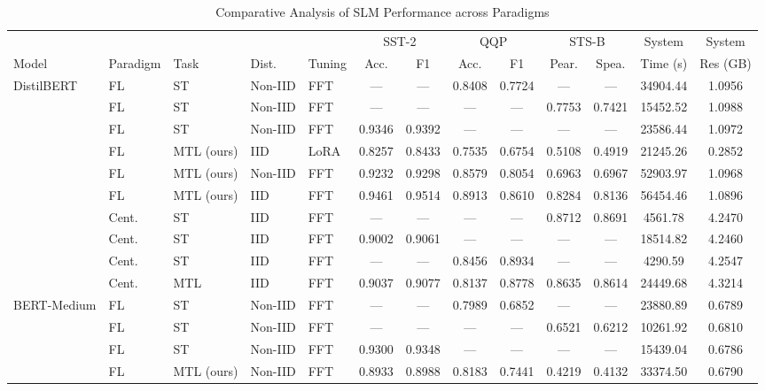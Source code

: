 \begin{table}[t]
  \centering
  \caption{Comparative Analysis of SLM Performance across Paradigms}
  \label{tab:results_consolidated}
  \scriptsize
  \setlength{\tabcolsep}{3pt}
  \begin{tabular}{lllllcccccccc}
    \toprule
    & & & & & \multicolumn{2}{c}{SST-2} & \multicolumn{2}{c}{QQP} & \multicolumn{2}{c}{STS-B} & System & System \\
    \cmidrule(lr){6-7} \cmidrule(lr){8-9} \cmidrule(lr){10-11}
    Model & Paradigm & Task & Dist. & Tuning & Acc. & F1 & Acc. & F1 & Pear. & Spea. & Time (s) & Res (GB) \\
    \midrule
    DistilBERT \cite{sanh2019distilbert} & FL & ST & Non-IID & FFT & --- & --- & 0.8408 & 0.7724 & --- & --- & 34904.44 & 1.0956 \\
     & FL & ST & Non-IID & FFT & --- & --- & --- & --- & 0.7753 & 0.7421 & 15452.52 & 1.0988 \\
     & FL & ST & Non-IID & FFT & 0.9346 & 0.9392 & --- & --- & --- & --- & 23586.44 & 1.0972 \\
     & FL & MTL (ours) & IID & LoRA & 0.8257 & 0.8433 & 0.7535 & 0.6754 & 0.5108 & 0.4919 & 21245.26 & 0.2852 \\
      & FL & MTL (ours) & Non-IID & FFT & 0.9232 & 0.9298 & 0.8579 & 0.8054 & 0.6963 & 0.6967 & 52903.97 & 1.0968 \\
      & FL & MTL (ours) & IID & FFT & 0.9461 & 0.9514 & 0.8913 & 0.8610 & 0.8284 & 0.8136 & 56454.46 & 1.0896 \\
     & Cent. & ST & IID & FFT & --- & --- & --- & --- & 0.8712 & 0.8691 & 4561.78 & 4.2470 \\
     & Cent. & ST & IID & FFT & 0.9002 & 0.9061 & --- & --- & --- & --- & 18514.82 & 4.2460 \\
     & Cent. & ST & IID & FFT & --- & --- & 0.8456 & 0.8934 & --- & --- & 4290.59 & 4.2547 \\
     & Cent. & MTL & IID & FFT & 0.9037 & 0.9077 & 0.8137 & 0.8778 & 0.8635 & 0.8614 & 24449.68 & 4.3214 \\
    \midrule
    BERT-Medium \cite{devlin2018bert} & FL & ST & Non-IID & FFT & --- & --- & 0.7989 & 0.6852 & --- & --- & 23880.89 & 0.6789 \\
     & FL & ST & Non-IID & FFT & --- & --- & --- & --- & 0.6521 & 0.6212 & 10261.92 & 0.6810 \\
     & FL & ST & Non-IID & FFT & 0.9300 & 0.9348 & --- & --- & --- & --- & 15439.04 & 0.6786 \\
      & FL & MTL (ours) & Non-IID & FFT & 0.8933 & 0.8988 & 0.8183 & 0.7441 & 0.4219 & 0.4132 & 33374.50 & 0.6790 \\

\end{tabular}
\end{table}
